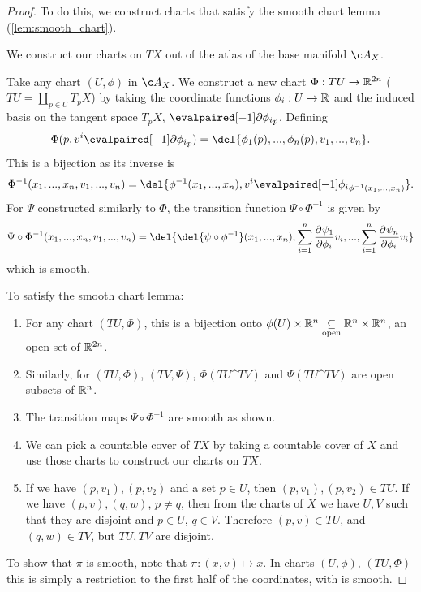 \begin{proof} To do this, we construct charts that satisfy the smooth chart lemma (\cref{lem:smooth_chart}).

	We construct our charts on \(TX\) out of the atlas of the base manifold \(\atlas{X}\).

	Take any chart \((U, \phi)\)  in \(\atlas{X}\).
	We construct a new chart \(\Phi: TU \to \mathbb{R}^{2n}\) (\(TU = \coprod_{p\in U} T_pX\)) by taking the coordinate functions \(\phi_i: U \to \mathbb{R}\) and the induced basis on the tangent space \(T_pX\), \(\eval{\partial \phi_i}_p\).
	Defining \[\Phi(p, v^i\eval{\partial \phi_i}_p) = \del{\phi_1(p), .
			.., \phi_n(p), v_1, ..., v_n}.\]
	This is a bijection as its inverse is \[\Phi^{-1}(x_1, .
		.., x_n, v_1, ..., v_n) = \del{\phi^{-1}(x_1, ..., x_n), v^i\eval{\phi_i}_{\phi^{-1}(x_1, ..., x_n)}}.\]
	For \(\Psi\) constructed similarly to \(\Phi\), the transition function \(\Psi \circ \Phi^{-1}\) is given by \[\Psi \circ \Phi^{-1}(x_1, .
		.., x_n, v_1, ..., v_n) = \del{\del{\psi\circ\phi^{-1}}(x_1, ..., x_n), \sum_{i=1}^n \pd{\psi_1}{\phi_i} v_i, ..., \sum_{i=1}^n \pd{\psi_n}{\phi_i}v_i} \] which is smooth.

	To satisfy the smooth chart lemma: \begin{enumerate}[noitemsep] \item For any chart \((TU, \Phi)\), this is a bijection onto \(\phi(U)\times \mathbb{R}^n \underset{\text{open}}{\subseteq} \mathbb{R}^n \times \mathbb{R}^n\), an open set of \(\mathbb{R}^{2n}\).
		\item Similarly, for \((TU, \Phi)\), \((TV, \Psi)\), \(\Phi(TU\^TV)\) and \(\Psi(TU\^TV)\) are open subsets of \(\mathbb{R}^n\).
		\item The transition maps \(\Psi \circ \Phi^{-1}\) are smooth as shown.
		\item We can pick a countable cover of \(TX\) by taking a countable cover of \(X\) and use those charts to construct our charts on \(TX\).
		\item If we have \((p,v_1), (p, v_2)\) and a set \(p \in U\), then \((p,v_1), (p, v_2) \in TU\).
		      If we have \((p,v), (q, w)\), \(p\neq q\), then from the charts of \(X\) we have \(U, V\) such that they are disjoint and \(p\in U\), \(q \in V\).
		      Therefore \((p, v)\in TU\), and \((q, w)\in TV\), but \(TU, TV\) are disjoint.
	\end{enumerate}

	To show that \(\pi\) is smooth, note that \(\pi: (x, v) \mapsto x\).
	In charts \((U, \phi)\), \((TU, \Phi)\) this is simply a restriction to the first half of the coordinates, with is smooth.
\end{proof}


